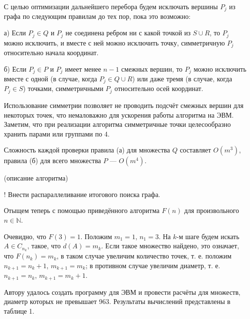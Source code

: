 \documentclass{article}
\begin{document}
С целью оптимизации дальнейшего перебора будем исключать вершины $P_j$ из графа по следующим правилам до тех пор, пока это возможно:

а) Если $P_j \in Q$ и $P_j$ не соединена ребром ни с какой точкой из $S \cup R$, то $P_j$ можно исключить, и вместе с ней можно исключить точку, симметричную $P_j$ относительно начала координат.

б) Если $P_j \in P$ и $P_j$ имеет менее $n-1$ смежных вершин, то $P_j$ можно исключить вместе с одной (в случае, когда $P_j \in Q \cup R$) или даже тремя (в случае, когда $P_j \in S$) точками, симметричными $P_j$ относительно осей координат.

Использование симметрии позволяет не проводить подсчёт смежных вершин для некоторых точек, что немаловажно для ускорения работы алгоритма на ЭВМ.
Заметим, что при реализации алгоритма симметричные точки целесообразно хранить парами или группами по 4.

Сложность каждой проверки правила (а) для множества $Q$ составляет $O(m^3)$, правила (б) для всего множества $P$ --- $O(m^4)$.





(описание алгоритма)


! Внести распараллеливание итогового поиска графа.


Отыщем теперь с помощью приведённого алгоритма $F(n)$ для произвольного $n \in \mathbb{N}$.

Очевидно, что $F(3) = 1$.
Положим $m_1=1$, $n_1=3$.
На $k$-м шаге будем искать $A \in C_{n_k}$, такое, что $d(A) = m_k$.
Если такое множество найдено, это означает, что $F(n_k)=m_k$,
в таком случае увеличим количество точек, т. е. положим $n_{k+1} = n_k +1$, $m_{k+1} = m_k$;
в противном случае увеличим диаметр, т. е. $n_{k+1} = n_k$, $m_{k+1} = m_k +1$.


Автору удалось создать программу для ЭВМ и провести расчёты для множеств, диаметр которых не превышает 963.
Результаты вычислений представлены в таблице 1.
\end{document}
